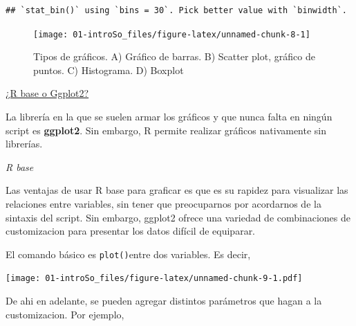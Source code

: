 \documentclass[
]{book}
\newenvironment{Shaded}{\begin{snugshade}}{\end{snugshade}}
\newcommand{\FunctionTok}[1]{\textcolor[rgb]{0.00,0.00,0.00}{#1}}
\newcommand{\NormalTok}[1]{#1}
\newcommand{\SpecialCharTok}[1]{\textcolor[rgb]{0.00,0.00,0.00}{#1}}
\begin{document}
\begin{verbatim}
## `stat_bin()` using `bins = 30`. Pick better value with `binwidth`.
\end{verbatim}

\begin{figure}

{\centering \texttt{[image: 01-introSo\_files/figure-latex/unnamed-chunk-8-1]} 

}

\caption{Tipos de gráficos. A) Gráfico de barras. B) Scatter plot, gráfico de puntos. C) Histograma. D) Boxplot}\label{fig:unnamed-chunk-8}
\end{figure}

\uline{¿R base o Ggplot2?}

La librería en la que se suelen armar los gráficos y que nunca falta en ningún script es \textbf{ggplot2}. Sin embargo, R permite realizar gráficos nativamente sin librerías.

\emph{R base}

Las ventajas de usar R base para graficar es que es su rapidez para visualizar las relaciones entre variables, sin tener que preocuparnos por acordarnos de la sintaxis del script. Sin embargo, ggplot2 ofrece una variedad de combinaciones de customizacion para presentar los datos difícil de equiparar.

El comando básico es \texttt{plot()}entre dos variables. Es decir,

\begin{Shaded}
\end{Shaded}

\texttt{[image: 01-introSo\_files/figure-latex/unnamed-chunk-9-1.pdf]}

De ahi en adelante, se pueden agregar distintos parámetros que hagan a la customizacion. Por ejemplo,
\end{document}
